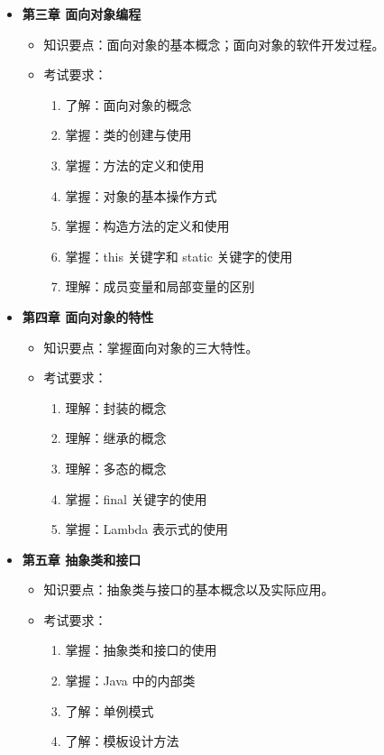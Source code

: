 \documentclass{../note}
\begin{document}
\begin{itemize}
  \item \textbf{第三章 面向对象编程}
    \begin{itemize}
      \item 知识要点：面向对象的基本概念；面向对象的软件开发过程。
      \item 考试要求：
        \begin{enumerate}
          \item 了解：面向对象的概念
          \item 掌握：类的创建与使用
          \item 掌握：方法的定义和使用
          \item 掌握：对象的基本操作方式
          \item 掌握：构造方法的定义和使用
          \item 掌握：this 关键字和 static 关键字的使用
          \item 理解：成员变量和局部变量的区别
        \end{enumerate}
    \end{itemize}

  \item \textbf{第四章 面向对象的特性}
    \begin{itemize}
      \item 知识要点：掌握面向对象的三大特性。
      \item 考试要求：
        \begin{enumerate}
          \item 理解：封装的概念
          \item 理解：继承的概念
          \item 理解：多态的概念
          \item 掌握：final 关键字的使用
          \item 掌握：Lambda 表示式的使用
        \end{enumerate}
    \end{itemize}

  \item \textbf{第五章 抽象类和接口}
    \begin{itemize}
      \item 知识要点：抽象类与接口的基本概念以及实际应用。
      \item 考试要求：
        \begin{enumerate}
          \item 掌握：抽象类和接口的使用
          \item 掌握：Java 中的内部类
          \item 了解：单例模式
          \item 了解：模板设计方法
        \end{enumerate}
    \end{itemize}


\end{itemize}
\end{document}
